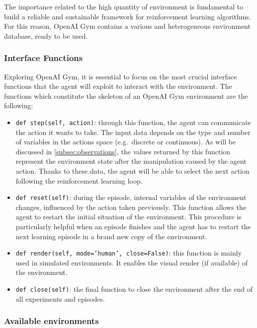 The importance related to the high quantity of environment is fundamental to build a reliable and sustainable framework for reinforcement learning algorithms.
For this reason, OpenAI Gym contains a various and heterogeneous environment database, ready to be used.

\subsubsection{Interface Functions}

Exploring OpenAI Gym, it is essential to focus on the most crucial interface functions that the agent will exploit to interact with the environment.
The functions which constitute the skeleton of an OpenAI Gym environment are the following:
\begin{itemize}
	\item \texttt{def step(self, action)}: through this function, the agent can communicate the action it wants to take.
The input data depends on the type and number of variables in the actions space (e.g.\ discrete or continuous).
As will be discussed in \vref{subsec:observations}, the values returned by this function represent the environment state after the manipulation caused by the agent action.
Thanks to these data, the agent will be able to select the next action following the reinforcement learning loop.
	\item \texttt{def reset(self)}: during the episode, internal variables of the environment changes, influenced by the action taken previously.
This function allows the agent to restart the initial situation of the environment.
This procedure is particularly helpful when an episode finishes and the agent has to restart the next learning episode in a brand new copy of the environment.
	\item \texttt{def render(self, mode='human', close=False)}: this function is mainly used in simulated environments.
It enables the visual render (if available) of the environment.
	\item \texttt{def close(self)}: the final function to close the environment after the end of all experiments and episodes.
\end{itemize}

\subsubsection{Available environments}

